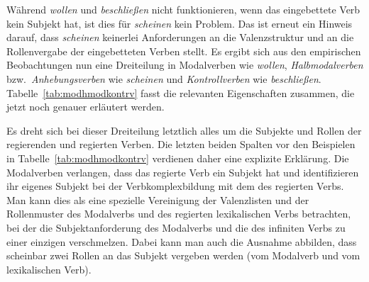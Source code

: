 Während \textit{wollen} und \textit{beschließen} nicht funktionieren, wenn das eingebettete Verb kein Subjekt hat, ist dies für \textit{scheinen} kein Problem.
Das ist erneut ein Hinweis darauf, dass \textit{scheinen} keinerlei Anforderungen an die Valenzstruktur und an die Rollenvergabe der eingebetteten Verben stellt.
Es ergibt sich aus den empirischen Beobachtungen nun eine Dreiteilung in Modalverben wie \textit{wollen}, \textit{Halbmodalverben} bzw.\ \textit{Anhebungsverben} wie \textit{scheinen} und \textit{Kontrollverben} wie \textit{beschließen}.
Tabelle~\ref{tab:modhmodkontrv} fasst die relevanten Eigenschaften zusammen, die jetzt noch genauer erläutert werden.

\begin{table}[!htbp]
  \caption{Modalverben, Halbmodalverben und Kontrollverben}
  \label{tab:modhmodkontrv}
\end{table}



Es dreht sich bei dieser Dreiteilung letztlich alles um die Subjekte und Rollen der regierenden und regierten Verben.
Die letzten beiden Spalten vor den Beispielen in Tabelle~\ref{tab:modhmodkontrv} verdienen daher eine explizite Erklärung.
Die Modalverben verlangen, dass das regierte Verb ein Subjekt hat und identifizieren ihr eigenes Subjekt bei der Verbkomplexbildung mit dem des regierten Verbs.
Man kann dies als eine spezielle Vereinigung der Valenzlisten und der Rollenmuster des Modalverbs und des regierten lexikalischen Verbs betrachten, bei der die Subjektanforderung des Modalverbs und die des infiniten Verbs zu einer einzigen verschmelzen.
Dabei kann man auch die Ausnahme abbilden, dass scheinbar zwei Rollen an das Subjekt vergeben werden (vom Modalverb und vom lexikalischen Verb).

